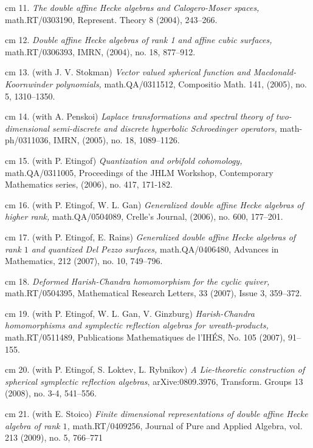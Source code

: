 \documentclass[11pt]{amsart}
\theoremstyle{plain}
\theoremstyle{definition}
\theoremstyle{remark}
\begin{document}
\noindent{} cm 11. {\it The double affine Hecke
algebras and Calogero-Moser spaces,} math.RT/0303190,  Represent.
Theory 8 (2004), 243--266.

\noindent{} cm 12. {\it Double affine Hecke algebras of rank 1 and
affine cubic surfaces,} math.RT/0306393,  IMRN,  (2004),  no. 18,
877--912.

\noindent{} cm 13. (with J. V. Stokman)  {\it Vector valued spherical
function and Macdonald-Koornwinder polynomials,}  math.QA/0311512,
Compositio Math.
 141, (2005), no. 5,   1310--1350.



\noindent{} cm 14. (with A. Penskoi)
 {\it Laplace transformations and spectral theory of two-dimensional
semi-discrete and discrete hyperbolic Schroedinger operators,}
math-ph/0311036, IMRN,  (2005), no. 18, 1089--1126.


\noindent{} cm 15. (with P. Etingof)
{\it Quantization and orbifold cohomology,}
 math.QA/0311005, Proceedings of the JHLM Workshop,
 Contemporary Mathematics series, (2006), no. 417,  171-182.


\noindent{} cm 16. (with P. Etingof, W. L. Gan)
{\it Generalized double affine
Hecke algebras of higher rank,}  math.QA/0504089, Crelle's Journal,
(2006), no. 600, 177--201.



\noindent{} cm 17. (with P. Etingof, E. Rains)
{\it  Generalized double affine
Hecke algebras of rank $1$ and quantized Del Pezzo surfaces,}
math.QA/0406480, Advances in Mathematics, 212
(2007), no. 10, 749--796.


\noindent{} cm 18. {\it Deformed Harish-Chandra homomorphism for the
cyclic quiver,} math.RT/0504395, Mathematical Research Letters,
33 (2007), Issue 3, 359--372.

\noindent{} cm 19. (with P. Etingof, W. L. Gan, V. Ginzburg)
 {\it Ha\-rish-Cha\-n\-dra ho\-mo\-mor\-phisms and sym\-plec\-tic ref\-lec\-tion
algebras for wre\-ath-pro\-ducts,} math.RT/0511489, 
 Publications Mathematiques de l'IH\'ES,  No. 105  (2007), 91--155.


\noindent{} cm 20.
(with P. Etingof, S. Loktev, L. Rybnikov)
{\it A Lie-theoretic construction of spherical symplectic reflection algebras}, arXive:0809.3976,
  Transform. Groups  13  (2008),  no. 3-4, 541--556.



\noindent{} cm 21. (with E. Stoico) {\it Finite dimensional representations of
double affine Hecke algebra of rank $1$,} math.RT/0409256,
 Journal of Pure and Applied Algebra,  vol. 213  (2009),  no. 5, 766--771
\end{document}
